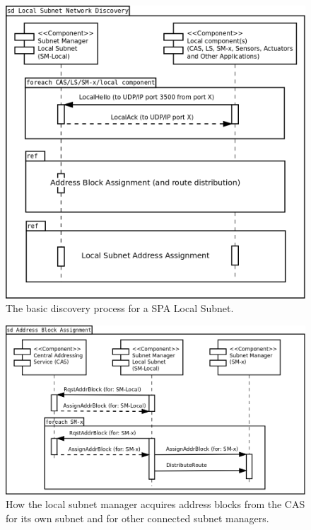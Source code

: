 \begin{figure}[h]
    \centering
    \includegraphics[width=\textwidth]{figures/vn_local_subnet_network_discovery}
    \caption{The basic discovery process for a SPA Local Subnet.}
    \label{fig:appendix_vn_local_subnet_network_discovery}
\end{figure}

\begin{figure}[h]
    \centering
    \includegraphics[width=\textwidth]{figures/vn_address_block_assignment}
    \caption{How the local subnet manager acquires address blocks from the CAS
    for its own subnet and for other connected subnet managers.}
    \label{fig:appendix_vn_address_block_assignment}
\end{figure}

